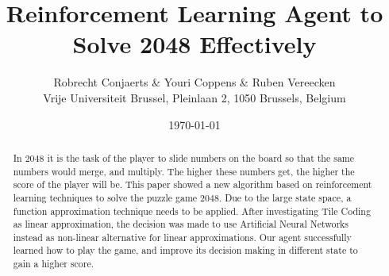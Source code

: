 \documentclass[a4paper,12pt]{article}
\begin{document}
\title{Reinforcement Learning Agent to Solve 2048 Effectively}
\author{
Robrecht Conjaerts \& Youri Coppens \& Ruben Vereecken \\
Vrije Universiteit Brussel, Pleinlaan 2, 1050 Brussels, Belgium \\
}
\date{\today}
\maketitle

\begin{abstract}
In $2048$ it is the task of the player to slide numbers on the board so that the same numbers would merge, and multiply. The higher these numbers get, the higher the score of the player will be. This paper showed a new algorithm based on reinforcement learning techniques to solve the puzzle game $2048$.
Due to the large state space, a function approximation technique needs to be applied.
After investigating Tile Coding as linear approximation, the decision was made to use Artificial Neural Networks instead as non-linear alternative for linear approximations.
Our agent successfully learned how to play the game, and improve its decision making in different state to gain a higher score.
\end{abstract}
\end{document}
